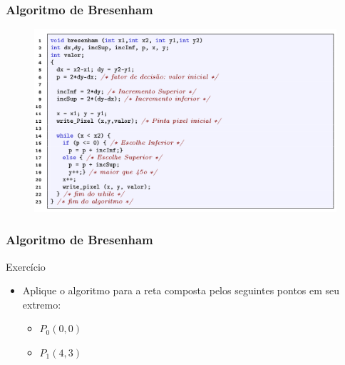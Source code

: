 \documentclass{beamer}
\begin{document}
\begin{frame}
\frametitle{Algoritmo de Bresenham}

		\begin{figure}[!h]
			\begin{center}
			\includegraphics[width=1\textwidth]{Figures/AlgBre}
			\end{center}
		\end{figure}
\end{frame}

\begin{frame}
\frametitle{Algoritmo de Bresenham}
		\begin{block}{Exercício}
		\begin{itemize}
			\item Aplique o algoritmo para a reta composta pelos seguintes pontos em seu extremo:
				\begin{itemize}
					\item $P_0(0,0)$
					\item $P_1(4,3)$
				\end{itemize}
		\end{itemize}
	\end{block}
\end{frame}


\end{document}
